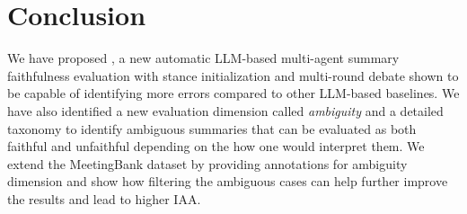 \section{Conclusion}
We have proposed \method, a new automatic LLM-based multi-agent summary faithfulness evaluation with stance initialization and multi-round debate shown to be capable of identifying more errors compared to other LLM-based baselines. We have also identified a new evaluation dimension called \textit{ambiguity} and a detailed taxonomy to identify ambiguous summaries that can be evaluated as both faithful and unfaithful depending on the how one would interpret them. We extend the MeetingBank dataset by providing annotations for ambiguity dimension and show how filtering the ambiguous cases can help further improve the results and lead to higher IAA.